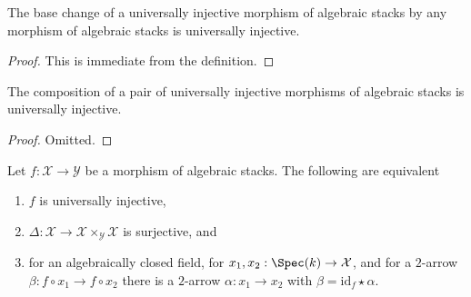 \begin{lemma}
\label{lemma-base-change-universally-injective}
The base change of a universally injective morphism of algebraic stacks
by any morphism of algebraic stacks is universally injective.
\end{lemma}

\begin{proof}
This is immediate from the definition.
\end{proof}

\begin{lemma}
\label{lemma-composition-universally-injective}
The composition of a pair of universally injective morphisms of
algebraic stacks is universally injective.
\end{lemma}

\begin{proof}
Omitted.
\end{proof}

\begin{lemma}
\label{lemma-universally-injective}
Let $f : \mathcal{X} \to \mathcal{Y}$ be a morphism of algebraic stacks.
The following are equivalent
\begin{enumerate}
\item $f$ is universally injective,
\item $\Delta : \mathcal{X} \to \mathcal{X} \times_\mathcal{Y} \mathcal{X}$
is surjective, and
\item for an algebraically closed field, for
$x_1, x_2 : \Spec(k) \to \mathcal{X}$, and for a $2$-arrow
$\beta : f \circ x_1 \to f \circ x_2$ there is a
$2$-arrow $\alpha : x_1 \to x_2$ with
$\beta = \text{id}_f \star \alpha$.
\end{enumerate}
\end{lemma}

